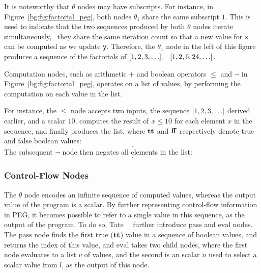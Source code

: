 It is noteworthy that $\theta$ nodes may have subscripts.  For instance,
in Figure~\ref{bg:fig:factorial_peg}, both nodes $\theta_1$ share the same
subscript $1$.  This is used to indicate that the two sequences produced
by both $\theta$ nodes iterate simultaneously, \ie~they share the same
iteration count so that a new value for \verb|x| can be computed as we update
\verb|y|.  Therefore, the $\theta_1$ node in the left of this figure produces
a sequence of the factorials of $[1, 2, 3, \mathellipsis]$, \ie~$[1, 2, 6, 24,
\mathellipsis]$.

Computation nodes, such as arithmetic $+$ and boolean operators $\leq$ and
$\neg$ in Figure~\ref{bg:fig:factorial_peg}, operates on a list of values, by
performing the computation on each value in the list.

For instance, the $\leq$ node accepts two inputs, the sequence $[1, 2, 3,
\mathellipsis]$ derived earlier, and a scalar $10$, computes the result of $x
\leq 10$ for each element $x$ in the sequence, and finally produces the list,
where $\mathbf{tt}$ and $\mathbf{ff}$ respectively denote true and false boolean
values:
\begin{equation}
    [
        \truelit, \truelit, \truelit, \truelit, \truelit,
        \truelit, \truelit, \truelit, \truelit, \truelit,
        \falselit, \falselit, \falselit, \mathellipsis
    ].
\end{equation}
The subsequent $\neg$ node then negates all elements in the list:
\begin{equation}
    [
        \falselit, \falselit, \falselit, \falselit, \falselit,
        \falselit, \falselit, \falselit, \falselit, \falselit,
        \truelit, \truelit, \truelit, \mathellipsis
    ].
    \label{bg:eq:bool_seq}
\end{equation}

\subsubsection{Control-Flow Nodes}

The $\theta$ node encodes an infinite sequence of computed values, whereas
the output value of the program is a scalar.  By further representing
control-flow information in PEG, it becomes possible to refer to a
single value in this sequence, as the output of the program.  To do so,
Tate~\etal~\cite{tate09} further introduce $\mathrm{pass}$ and $\mathrm{eval}$
nodes.  The $\mathrm{pass}$ node finds the first true ($\mathbf{tt}$) value
in a sequence of boolean values, and returns the index of this value, and
$\mathrm{eval}$ takes two child nodes, where the first node evaluates to a list
$v$ of values, and the second is an scalar $n$ used to select a scalar value
from $l$, as the output of this node.

